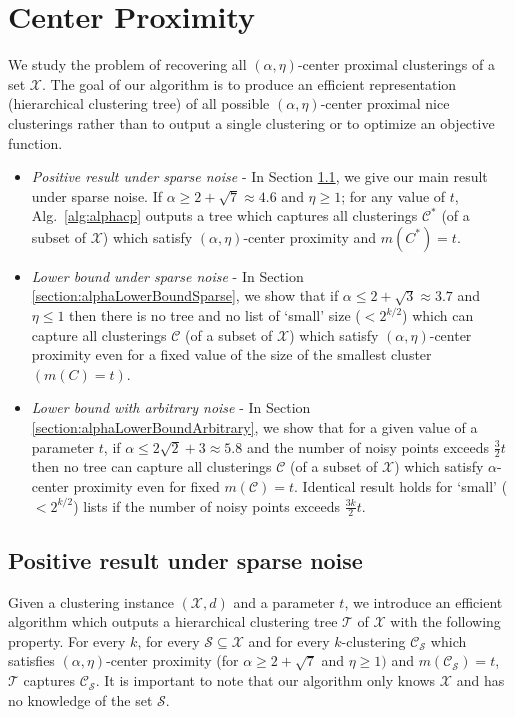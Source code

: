 \documentclass[letterpaper,12pt,titlepage,oneside,final]{book}
\newcommand{\mc}{\mathcal}
\begin{document}
\section{Center Proximity}
We study the problem of recovering all $(\alpha, \eta)$-center proximal clusterings of a set $\mc X$. The goal of our algorithm is to produce an efficient representation (hierarchical clustering tree) of all possible $(\alpha, \eta)$-center proximal nice clusterings rather than to output a single clustering or to optimize an objective function.
\begin{itemize}
\item  {\it Positive result under sparse noise} - In Section \ref{section:positiveResultSparseNoise}, we give our main result under sparse noise. If $\alpha \ge 2 + \sqrt{7} \approx 4.6$ and $\eta \ge 1$; for any value of $t$, Alg.~\ref{alg:alphacp} outputs a tree which captures all clusterings $\mc C^*$ (of a subset of $\mc X$) which satisfy $(\alpha, \eta)$-center proximity and $m(C^*)=t$.
\item  {\it Lower bound under sparse noise} - In Section \ref{section:alphaLowerBoundSparse}, we show that if $\alpha \le 2 + \sqrt{3} \approx 3.7$ and $\eta \le 1$ then there is no tree and no list of `small' size ($< 2^{k/2}$) which can capture all clusterings $\mc C$ (of a subset of $\mc X$) which satisfy $(\alpha, \eta)$-center proximity even for a fixed value of the size of the smallest cluster $(m(C) = t)$.
\item {\it Lower bound with arbitrary noise} - In Section \ref{section:alphaLowerBoundArbitrary}, we show that for a given value of a parameter $t$, if $\alpha \le 2\sqrt{2} + 3 \approx 5.8$ and the number of noisy points exceeds $\frac{3}{2}t$ then no tree can capture all clusterings $\mc C$ (of a subset of $\mc X$) which satisfy $\alpha$-center proximity even for fixed $m(\mc C) = t$. Identical result holds for `small' ($<2^{k/2}$) lists if the number of noisy points exceeds $\frac{3k}{2}t$.
\end{itemize} 

\subsection{Positive result under sparse noise}
\label{section:positiveResultSparseNoise}
Given a clustering instance $(\mc X, d)$ and a parameter $t$, we introduce an efficient algorithm which outputs a hierarchical clustering tree $\mc T$ of $\mc X$ with the following property. For every $k$, for every $\mc S \subseteq \mc X$ and for every $k$-clustering $\mc C_{\mc S}$ which satisfies $(\alpha, \eta)$-center proximity (for $\alpha \ge 2 + \sqrt{7}$ and $ \eta \ge 1)$ and $m(\mc C_{\mc S}) = t$, $\mc T$ captures $\mc C_{\mc S}$. It is important to note that our algorithm only knows $\mc X$ and has no knowledge of the set $\mc S$.
\end{document}

